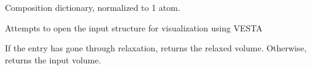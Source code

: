 \documentclass[letterpaper,10pt,english]{sphinxmanual}
\begin{document}
\begin{fulllineitems}
\begin{fulllineitems}
\end{fulllineitems}


\begin{fulllineitems}
\label{models:qmpy.Entry.unit_comp}
Composition dictionary, normalized to 1 atom.

\end{fulllineitems}


\begin{fulllineitems}
\label{models:qmpy.Entry.visualize}
Attempts to open the input structure for visualization using VESTA

\end{fulllineitems}


\begin{fulllineitems}
\label{models:qmpy.Entry.volume}
If the entry has gone through relaxation, returns the relaxed
volume. Otherwise, returns the input volume.

\end{fulllineitems}


\end{fulllineitems}

\end{document}

